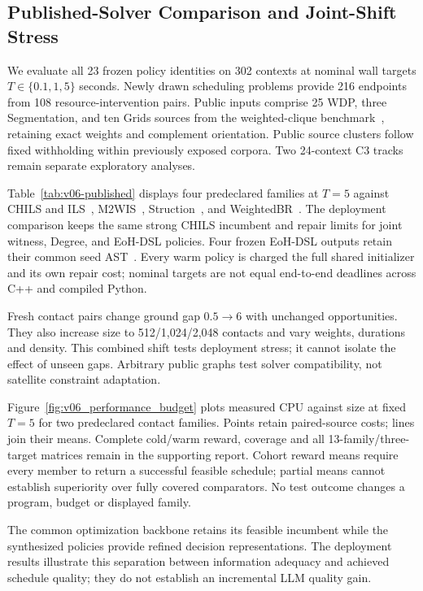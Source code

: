 \subsection{Published-Solver Comparison and Joint-Shift Stress}
\label{sec:v06_performance}

We evaluate all 23 frozen policy identities on 302 contexts at nominal wall
 targets $T\in\{0.1,1,5\}$ seconds. Newly drawn scheduling problems provide
216 endpoints from 108 resource-intervention pairs. Public inputs comprise
25 WDP, three Segmentation, and ten Grids sources from the weighted-clique
benchmark~\cite{mccreesh2017evaluation}, retaining exact weights and complement
orientation. Public source clusters follow fixed withholding within previously
exposed corpora. Two 24-context C3 tracks remain separate exploratory analyses.

Table~\ref{tab:v06-published} displays four predeclared families at $T=5$
against CHILS and ILS~\cite{grossmann2025chils}, M2WIS~\cite{grossmann2024mmwis},
Struction~\cite{gellner2021struction}, and WeightedBR~\cite{lamm2019weighted}.
The deployment comparison keeps the same strong CHILS incumbent and repair
limits for joint witness, Degree, and EoH-DSL policies. Four frozen EoH-DSL
outputs retain their common seed AST~\cite{liu2024eoh}. Every warm policy is
charged the full shared initializer and its own repair cost; nominal targets
are not equal end-to-end deadlines across C++ and compiled Python.

Fresh contact pairs change ground gap $0.5\!\to\!6$ with unchanged
opportunities. They also increase size to 512/1,024/2,048 contacts and vary
weights, durations and density. This combined shift tests deployment stress;
it cannot isolate the effect of unseen gaps. Arbitrary public graphs test
solver compatibility, not satellite constraint adaptation.

Figure~\ref{fig:v06_performance_budget} plots measured CPU against size at
fixed $T=5$ for two predeclared contact families. Points retain paired-source
costs; lines join their means. Complete cold/warm reward, coverage and all
13-family/three-target matrices remain in the supporting report. Cohort
reward means require every member to return a successful feasible schedule;
partial means cannot establish superiority over fully covered comparators.
No test outcome changes a program, budget or displayed family.

The common optimization backbone retains its feasible incumbent while the
synthesized policies provide refined decision representations. The deployment
results illustrate this separation between information adequacy and achieved
schedule quality; they do not establish an incremental LLM quality gain.
